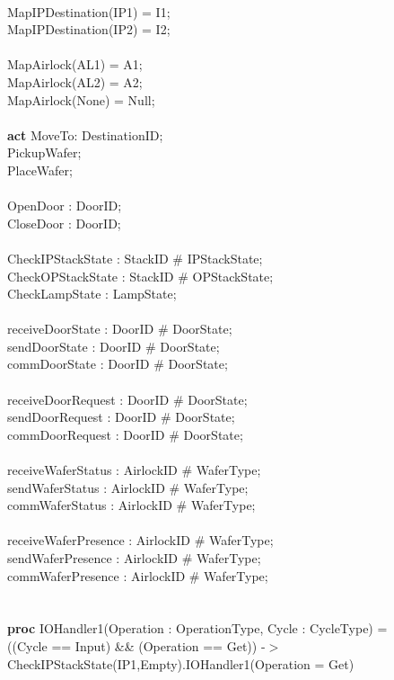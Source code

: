 \documentclass[a4paper,12pt]{article}
\begin{document}
\\		MapIPDestination(IP1) = I1;
\\		MapIPDestination(IP2) = I2;
\\
\\		MapAirlock(AL1) = A1;
\\		MapAirlock(AL2) = A2;
\\		MapAirlock(None) = Null;
\\
\\\textbf{act} MoveTo: DestinationID;
\\	  PickupWafer;
\\	  PlaceWafer;
\\
\\	    OpenDoor : DoorID;
\\		CloseDoor : DoorID;
\\
\\	  CheckIPStackState : StackID \# IPStackState;
\\	  CheckOPStackState : StackID \# OPStackState;
\\		CheckLampState : LampState;
\\
\\	  receiveDoorState : DoorID \# DoorState;
\\	  sendDoorState : DoorID \# DoorState;
\\		commDoorState : DoorID \# DoorState;
\\
\\	  receiveDoorRequest : DoorID \# DoorState;
\\		sendDoorRequest : DoorID \# DoorState;
\\		commDoorRequest : DoorID \# DoorState;
\\
\\	  receiveWaferStatus : AirlockID \# WaferType;
\\		sendWaferStatus : AirlockID \# WaferType;
\\		commWaferStatus : AirlockID \# WaferType;
\\
\\	  receiveWaferPresence : AirlockID \# WaferType;
\\		sendWaferPresence : AirlockID \# WaferType;
\\		commWaferPresence : AirlockID \# WaferType;
\\
\\
\\\textbf{proc} IOHandler1(Operation : OperationType, Cycle : CycleType) = 
\\((Cycle == Input) \&\& (Operation == Get)) -$>$ CheckIPStackState(IP1,Empty).IOHandler1(Operation = Get)
\end{document}

